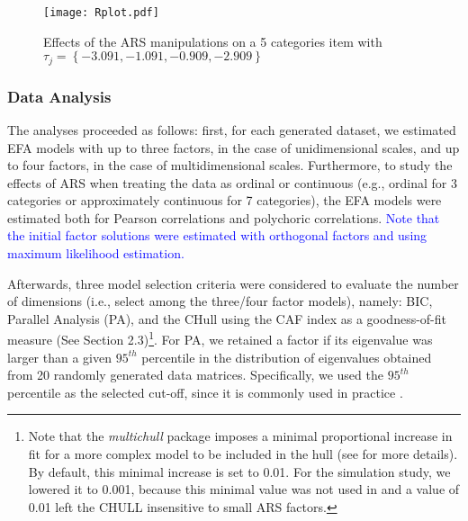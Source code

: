 \documentclass[a4paper,man,natbib]{apa6}
\begin{document}
\begin{linenumbers}
\begin{figure}[h]
	\centering
	\texttt{[image: Rplot.pdf]}
	\caption {Effects of the ARS manipulations on a 5 categories item with $\tau_{j} = \left\lbrace -3.091, -1.091, -0.909, -2.909 \right\rbrace $}
	\label{fig:ARS}
\end{figure}


\subsubsection{Data Analysis}

The analyses proceeded as follows: first, for each generated dataset, we estimated EFA models with up to three factors, in the case of unidimensional scales, and up to four factors, in the case of multidimensional scales. Furthermore, to study the effects of ARS when treating the data as ordinal or continuous (e.g., ordinal for 3 categories or approximately continuous for 7 categories), the EFA models were estimated both for Pearson correlations and polychoric correlations.\label{refpage:R2Mj3b} \textcolor{blue}{Note that the initial factor solutions were estimated with orthogonal factors and using maximum likelihood estimation.}


Afterwards, three model selection criteria were considered to evaluate the number of dimensions (i.e., select among the three/four factor models), namely: BIC, Parallel Analysis (PA), and the CHull using the CAF index as a goodness-of-fit measure (See Section 2.3)\footnote{Note that the \textit{multichull} package imposes a minimal proportional increase in fit for a more complex model to be included in the hull (see \citealp{vervloet2017multichull} for more details). By default, this minimal increase is set to 0.01. For the simulation study,  we lowered it to 0.001, because this minimal value was not used in \citet{lorenzo2011hull} and a value of 0.01 left the CHULL insensitive to small ARS factors.}. 
For PA, we retained a factor if its eigenvalue was larger than a given $95^{th}$ percentile in the distribution of eigenvalues obtained from 20 randomly generated data matrices. Specifically, we used the $95^{th}$ percentile as the selected cut-off, since it is commonly used in practice \citep{lorenzo2011hull}. 


\end{linenumbers}
\end{document}
